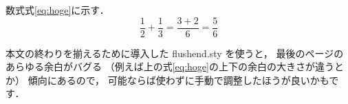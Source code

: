 \documentclass[10pt, a4j, uplatex, twocolumn]{jsarticle}
\begin{document}
数式式\eqref{eq:hoge}に示す．
\begin{equation}
    \frac{1}{2} + \frac{1}{3} = \frac{3 + 2}{6} = \frac{5}{6} \label{eq:hoge}
\end{equation}

本文の終わりを揃えるために導入した flushend.sty を使うと，
最後のページのあらゆる余白がバグる
（例えば上の式\eqref{eq:hoge}の上下の余白の大きさが違うとか）
傾向にあるので，
可能ならば使わずに手動で調整したほうが良いかもです．



\end{document}
